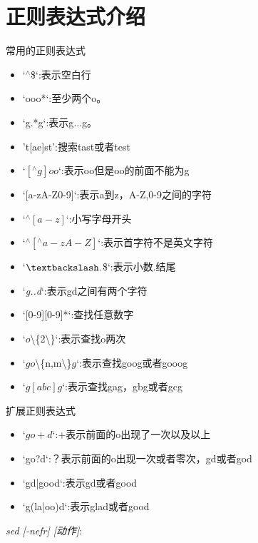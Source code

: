 \documentclass{book}
\begin{document}
\section{正则表达式介绍}
常用的正则表达式
\begin{itemize}
\item `${}^\wedge$\$`:表示空白行
\item `ooo*`:至少两个o。
\item `g.*g`:表示g$\ldots$g。
\item 't[ae]st':搜索tast或者test
\item `$[{}^\wedge g]oo$`:表示oo但是oo的前面不能为g
\item `[a-zA-Z0-9]`:表示a到z，A-Z,0-9之间的字符
\item `${}^\wedge[a-z]$`:小写字母开头
\item `${}^{\wedge}{}[{}^\wedge{}a-zA-Z]$`:表示首字符不是英文字符
\item `$\textbackslash.$\$`:表示小数.结尾
\item `\textit{g..d}`:表示gd之间有两个字符
\item `[0-9][0-9]*`:查找任意数字
\item `$o$\textbackslash\{2\textbackslash\}`:表示查找o两次
\item `$go$\textbackslash\{n,m\textbackslash\}$g$`:表示查找goog或者gooog
\item `$g[abc]g$`:表示查找gag，gbg或者gcg
\end{itemize}
扩展正则表达式
\begin{itemize}
\item `$go+d$`:+表示前面的o出现了一次以及以上
\item `go?d`:？表示前面的o出现一次或者零次，gd或者god
\item `gd|good`:表示gd或者good
\item `g(la|oo)d`:表示glad或者good
\end{itemize}
\textit{sed [-nefr] [动作]}:
\end{document}
